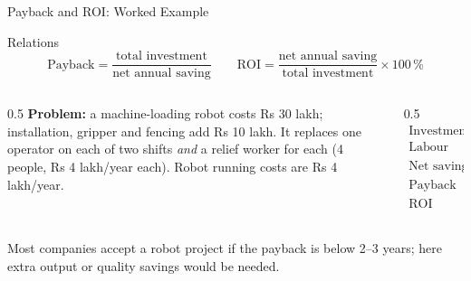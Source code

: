 \documentclass[aspectratio=169]{beamer}
\begin{document}
	\begin{frame}{Payback and ROI: Worked Example}
		\begin{block}{Relations}
			\[
			\text{Payback} = \frac{\text{total investment}}{\text{net annual saving}}
			\qquad
			\text{ROI} = \frac{\text{net annual saving}}{\text{total investment}}\times100\,\%
			\]
		\end{block}
		\begin{columns}[T]
			\begin{column}{0.5\textwidth}
				\textbf{Problem:} a machine-loading robot costs Rs 30 lakh; installation, gripper and fencing add Rs 10 lakh. It replaces one operator on each of two shifts \emph{and} a relief worker for each (4 people, Rs 4 lakh/year each). Robot running costs are Rs 4 lakh/year.
			\end{column}
			\begin{column}{0.5\textwidth}
				\small
				\begin{align*}
					\text{Investment} &= 30 + 10 = 40\ \text{lakh}\\
					\text{Labour saving} &= 4\times4 = 16\ \text{lakh/yr}\\
					\text{Net saving} &= 16 - 4 = 12\ \text{lakh/yr}\\
					\text{Payback} &= 40/12 \approx \boxed{3.3\ \text{years}}\\
					\text{ROI} &= 12/40 = \boxed{30\,\%}
				\end{align*}
			\end{column}
		\end{columns}
		\vspace{0.1cm}
		\footnotesize\centering Most companies accept a robot project if the payback is below 2--3 years; here extra output or quality savings would be needed.
	\end{frame}
\end{document}
